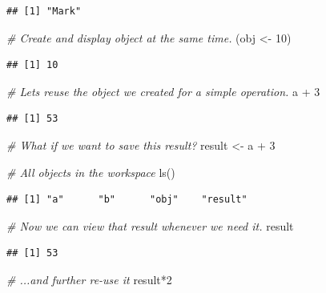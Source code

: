 \documentclass[
]{book}
\newenvironment{Shaded}{\begin{snugshade}}{\end{snugshade}}
\newcommand{\CommentTok}[1]{\textcolor[rgb]{0.56,0.35,0.01}{\textit{#1}}}
\newcommand{\DecValTok}[1]{\textcolor[rgb]{0.00,0.00,0.81}{#1}}
\newcommand{\FunctionTok}[1]{\textcolor[rgb]{0.00,0.00,0.00}{#1}}
\newcommand{\NormalTok}[1]{#1}
\newcommand{\OtherTok}[1]{\textcolor[rgb]{0.56,0.35,0.01}{#1}}
\newcommand{\SpecialCharTok}[1]{\textcolor[rgb]{0.00,0.00,0.00}{#1}}
\begin{document}
\begin{verbatim}
## [1] "Mark"
\end{verbatim}

\begin{Shaded}
\begin{Highlighting}[]
\CommentTok{\# Create and display object at the same time.}
\NormalTok{(obj }\OtherTok{\textless{}{-}} \DecValTok{10}\NormalTok{)}
\end{Highlighting}
\end{Shaded}

\begin{verbatim}
## [1] 10
\end{verbatim}

\begin{Shaded}
\begin{Highlighting}[]
\CommentTok{\# Let\textquotesingle{}s reuse the object we created for a simple operation.}
\NormalTok{a }\SpecialCharTok{+} \DecValTok{3}
\end{Highlighting}
\end{Shaded}

\begin{verbatim}
## [1] 53
\end{verbatim}

\begin{Shaded}
\begin{Highlighting}[]
\CommentTok{\# What if we want to save this result?}
\NormalTok{result }\OtherTok{\textless{}{-}}\NormalTok{ a }\SpecialCharTok{+} \DecValTok{3}

\CommentTok{\# All objects in the workspace}
\FunctionTok{ls}\NormalTok{()}
\end{Highlighting}
\end{Shaded}

\begin{verbatim}
## [1] "a"      "b"      "obj"    "result"
\end{verbatim}

\begin{Shaded}
\begin{Highlighting}[]
\CommentTok{\# Now we can view that result whenever we need it.}
\NormalTok{result}
\end{Highlighting}
\end{Shaded}

\begin{verbatim}
## [1] 53
\end{verbatim}

\begin{Shaded}
\begin{Highlighting}[]
\CommentTok{\# ...and further re{-}use it}
\NormalTok{result}\SpecialCharTok{*}\DecValTok{2}
\end{Highlighting}
\end{Shaded}
\end{document}
